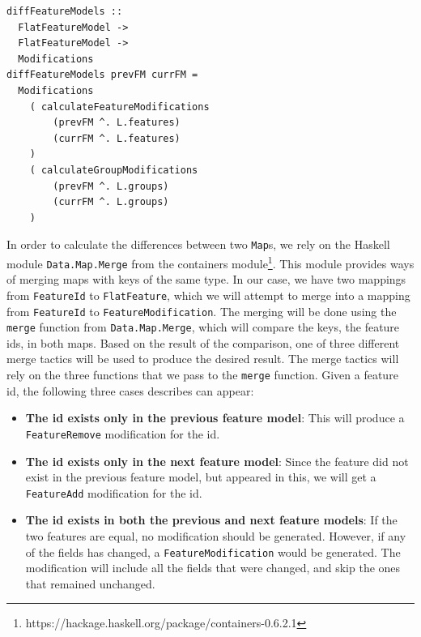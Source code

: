 \documentclass[a4paper,english]{ifimaster}
\begin{document}
\begin{verbatim}
diffFeatureModels :: 
  FlatFeatureModel -> 
  FlatFeatureModel -> 
  Modifications
diffFeatureModels prevFM currFM =
  Modifications
    ( calculateFeatureModifications
        (prevFM ^. L.features)
        (currFM ^. L.features)
    )
    ( calculateGroupModifications
        (prevFM ^. L.groups)
        (currFM ^. L.groups)
    )
\end{verbatim}

In order to calculate the differences between two \texttt{Map}s, we rely on the Haskell module \texttt{Data.Map.Merge} from the containers module\footnote{https://hackage.haskell.org/package/containers-0.6.2.1}. This module provides ways of merging maps with keys of the same type. In our case, we have two mappings from \texttt{FeatureId} to \texttt{FlatFeature}, which we will attempt to merge into a mapping from \texttt{FeatureId} to \texttt{FeatureModification}. The merging will be done using the \texttt{merge} function from \texttt{Data.Map.Merge}, which will compare the keys, the feature ids, in both maps. Based on the result of the comparison, one of three different merge tactics will be used to produce the desired result. The merge tactics will rely on the three functions that we pass to the \texttt{merge} function. Given a feature id, the following three cases describes can appear:

\begin{itemize}
  \item \textbf{The id exists only in the previous feature model}: This will produce a \texttt{FeatureRemove} modification for the id.
  \item \textbf{The id exists only in the next feature model}: Since the feature did not exist in the previous feature model, but appeared in this, we will get a \texttt{FeatureAdd} modification for the id.
  \item \textbf{The id exists in both the previous and next feature models}: If the two features are equal, no modification should be generated. However, if any of the fields has changed, a \texttt{FeatureModification} would be generated. The modification will include all the fields that were changed, and skip the ones that remained unchanged.
\end{itemize}
\end{document}
